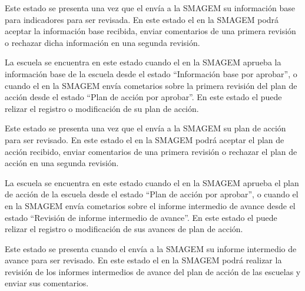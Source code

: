 \begin{description}
       Este estado se presenta una vez que el  envía a la SMAGEM su información base para indicadores para ser revisada. En este estado el  en la SMAGEM podrá aceptar la información base recibida, enviar comentarios de una primera revisión o rechazar dicha información en una segunda revisión.

       La escuela se encuentra en este estado cuando el  en la SMAGEM aprueba la información base de la escuela desde el estado ``Información base por aprobar'', o cuando el  en la SMAGEM envía cometarios sobre la primera revisión del plan de acción desde el estado ``Plan de acción por aprobar''. En este estado el  puede relizar el registro o modificación de su plan de acción.

       Este estado se presenta una vez que el  envía a la SMAGEM su plan de acción para ser revisado. En este estado el  en la SMAGEM podrá aceptar el plan de acción recibido, enviar comentarios de una primera revisión o rechazar el plan de acción en una segunda revisión.

       La escuela se encuentra en este estado cuando el  en la SMAGEM aprueba el plan de acción de la escuela desde el estado ``Plan de acción por aprobar'', o cuando el  en la SMAGEM envía cometarios sobre el informe intermedio de avance desde el estado ``Revisión de informe intermedio de avance''. En este estado el  puede relizar el registro o modificación de sus avances de plan de acción.

       Este estado se presenta cuando el  envía a la SMAGEM su informe intermedio de avance para ser revisado. En este estado el  en la SMAGEM podrá realizar la revisión de los informes intermedios de avance del plan de acción de las escuelas y enviar sus comentarios.
      

\end{description}

